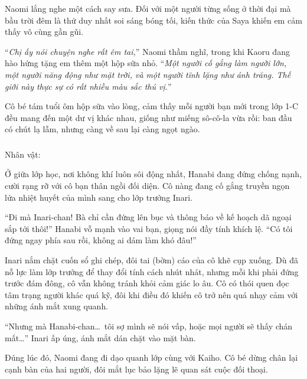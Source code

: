 \documentclass[../main.tex]{subfiles}
\begin{document}
Naomi lắng nghe một cách say sưa. Đối với một người từng sống ở thời đại mà bầu trời đêm là thứ duy nhất soi sáng bóng tối, kiến thức của Saya khiến em cảm thấy vô cùng gần gũi.

``\textit{Chị ấy nói chuyện nghe rất êm tai,}'' Naomi thầm nghĩ, trong khi Kaoru đang hào hứng tặng em thêm một hộp sữa nhỏ. ``\textit{Một người cố gắng làm người lớn, một người năng động như mặt trời, và một người tĩnh lặng như ánh trăng. Thế giới này thực sự có rất nhiều màu sắc thú vị.}''

Cô bé tám tuổi ôm hộp sữa vào lòng, cảm thấy mỗi người bạn mới trong lớp 1-C đều mang đến một dư vị khác nhau, giống như miếng sô-cô-la vừa rồi: ban đầu có chút lạ lẫm, nhưng càng về sau lại càng ngọt ngào.

\newpage

\subsubsection*{\label{ep-ER8}}
\begin{center}{\caviar Nhân vật:  }\end{center}

Ở giữa lớp học, nơi không khí luôn sôi động nhất, Hanabi đang đứng chống nạnh, cười rạng rỡ với cô bạn thân ngồi đối diện. Cô nàng đang cố gắng truyền ngọn lửa nhiệt huyết của mình sang cho lớp trưởng Inari.

``Đi mà Inari-chan! Bà chỉ cần đứng lên bục và thông báo về kế hoạch dã ngoại sắp tới thôi!'' Hanabi vỗ mạnh vào vai bạn, giọng nói đầy tính khích lệ. ``Có tôi đứng ngay phía sau rồi, không ai dám làm khó đâu!''

Inari nắm chặt cuốn sổ ghi chép, đôi tai (bờm) cáo của cô khẽ cụp xuống. Dù đã nỗ lực làm lớp trưởng để thay đổi tính cách nhút nhát, nhưng mỗi khi phải đứng trước đám đông, cô vẫn không tránh khỏi cảm giác lo âu. Cô có thói quen đọc tâm trạng người khác quá kỹ, đôi khi điều đó khiến cô trở nên quá nhạy cảm với những ánh mắt xung quanh.

``Nhưng mà Hanabi-chan\dots\ tôi sợ mình sẽ nói vấp, hoặc mọi người sẽ thấy chán mất\dots'' Inari ấp úng, ánh mắt dán chặt vào mặt bàn.

Đúng lúc đó, Naomi đang đi dạo quanh lớp cùng với Kaiho. Cô bé dừng chân lại cạnh bàn của hai người, đôi mắt lục bảo lặng lẽ quan sát cuộc đối thoại.
\end{document}

